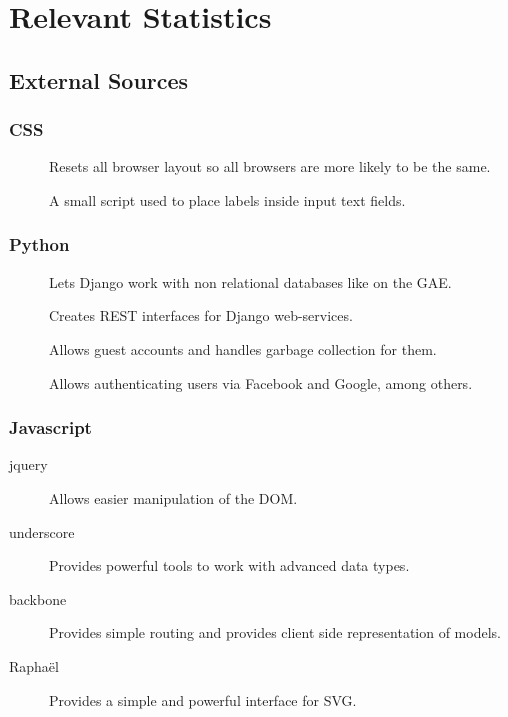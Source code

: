 \section{Relevant Statistics}
\subsection{External Sources}
\subsubsection{CSS}
\begin{description}
	\item[] Resets all browser layout so all browsers are more likely to be the same.
	\item[] A small script used to place labels inside input text fields.
\end{description}
	
\subsubsection{Python}
\begin{description}
	\item[] Lets Django work with non relational databases like on the GAE.
	\item[] Creates REST interfaces for Django web-services.
	\item[] Allows guest accounts and handles garbage collection for them.
	\item[] Allows authenticating users via Facebook and Google, among others.
\end{description}

\subsubsection{Javascript}
\begin{description}
	\item[jquery] Allows easier manipulation of the DOM.
	\item[underscore] Provides powerful tools to work with advanced data types.
	\item[backbone] Provides simple routing and provides client side representation of models.
	\item[Rapha\"{e}l] Provides a simple and powerful interface for SVG.
\end{description}

